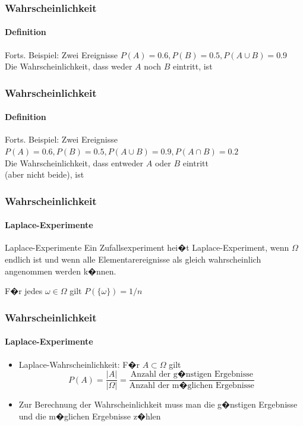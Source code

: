 \documentclass[12pt,show notes]{beamer}
\begin{document}
\begin{frame}
\frametitle{Wahrscheinlichkeit}
\framesubtitle{Definition}
\begin{exampleblock}{Forts. Beispiel: Zwei Ereignisse}
$P(A)=0.6, P(B)=0.5, P(A\cup B)=0.9$\\[1ex]
Die Wahrscheinlichkeit, dass weder $A$ noch $B$ eintritt, ist
\end{exampleblock}
\end{frame}

\begin{frame}
\frametitle{Wahrscheinlichkeit}
\framesubtitle{Definition}
\begin{exampleblock}{Forts. Beispiel: Zwei Ereignisse}
$P(A)=0.6, P(B)=0.5, P(A\cup B)=0.9, P(A\cap B)=0.2$\\[1ex]
Die Wahrscheinlichkeit, dass entweder $A$ oder $B$ eintritt\\ (aber nicht beide), ist
\end{exampleblock}
\end{frame}

\begin{frame}
\frametitle{Wahrscheinlichkeit}
\framesubtitle{Laplace-Experimente}
\begin{block}{Laplace-Experimente}
Ein Zufallsexperiment hei�t Laplace-Experiment, wenn
$\Omega $ endlich ist und wenn alle Elementarereignisse
als gleich wahrscheinlich angenommen werden k�nnen.
\end{block}
\medskip
F�r jedes $\omega\in\Omega$ gilt $P(\{\omega\})=1/n$
\end{frame}

\begin{frame}
\frametitle{Wahrscheinlichkeit}
\framesubtitle{Laplace-Experimente}
\begin{itemize}
\item Laplace-Wahrscheinlichkeit: F�r $A\subset \Omega $ gilt 
\[P(A)=\frac{|A|}{|\Omega|}=\frac{\text{Anzahl der g�nstigen Ergebnisse}}{\text{Anzahl der m�glichen Ergebnisse}} \]
\item Zur Berechnung der Wahrscheinlichkeit muss 
man die g�nstigen Ergebnisse und die m�glichen Ergebnisse z�hlen
\end{itemize}
\end{frame}
\end{document}
